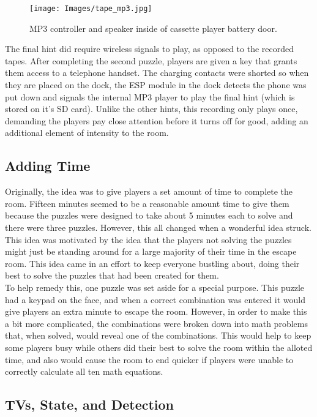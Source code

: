 \documentclass[conference]{IEEEtran}
\begin{document}
\begin{figure}[ht]
    \centering
    \texttt{[image: Images/tape\_mp3.jpg]}
    \caption{MP3 controller and speaker inside of cassette player battery door.}
\end{figure}

\indent The final hint did require wireless signals to play, as opposed to the recorded tapes. After completing the 
second puzzle, players are given a key that grants them access to a telephone handset. The charging contacts were shorted 
so when they are placed on the dock, the ESP module in the dock detects the phone was put down and signals the internal MP3 
player to play the final hint (which is stored on it's SD card). Unlike the other hints, this recording only plays once, 
demanding the players pay close attention before it turns off for good, adding an additional element of intensity to the room.

\subsection{Adding Time} %

\indent Originally, the idea was to give players a set amount of time to complete the room. Fifteen minutes seemed to be a reasonable amount
time to give them because the puzzles were designed to take about 5 minutes each to solve and there were three puzzles. However,
this all changed when a wonderful idea struck. This idea was motivated by the idea that the players not solving the puzzles might
just be standing around for a large majority of their time in the escape room. This idea came in an effort to keep everyone bustling about, doing
their best to solve the puzzles that had been created for them.
\\
\indent To help remedy this, one puzzle was set aside for a special purpose. This puzzle had a keypad on the face, and when a correct combination was
entered it would give players an extra minute to escape the room. However, in order to make this a bit more complicated, the combinations were broken down
into math problems that, when solved, would reveal one of the combinations. This would help to keep some players busy while others did their best to solve
the room within the alloted time, and also would cause the room to end quicker if players were unable to correctly calculate all ten math equations.

\subsection{TVs, State, and Detection} %
\end{document}
